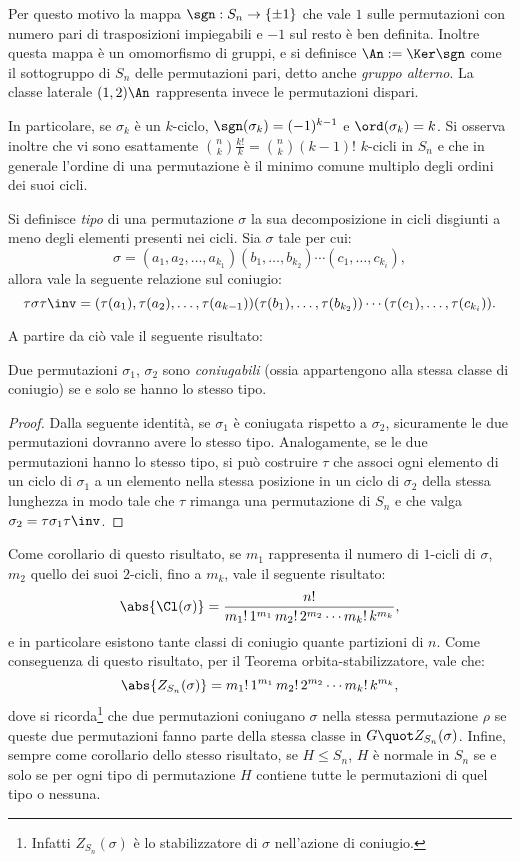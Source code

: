 \documentclass[12pt]{scrartcl}
\begin{document}
	Per questo motivo la mappa $\sgn : S_n \to \{\pm 1\}$ che vale $1$ sulle
	permutazioni con numero pari di trasposizioni impiegabili e $-1$ sul resto
	è ben definita. Inoltre questa mappa è un omomorfismo di gruppi, e si
	definisce $\An := \Ker \sgn$ come il sottogruppo di $S_n$ delle permutazioni
	pari, detto anche \textit{gruppo alterno}. La classe laterale $(1, 2) \An$
	rappresenta invece le permutazioni dispari. \medskip
	
	
	In particolare, se $\sigma_k$ è un $k$-ciclo, $\sgn(\sigma_k) = (-1)^{k-1}$ e $\ord(\sigma_k) = k$. Si osserva inoltre che vi sono esattamente $\binom{n}{k} \frac{k!}{k} =
	\binom{n}{k} (k-1)!$ $k$-cicli in $S_n$ e che in generale l'ordine
	di una permutazione è il minimo comune multiplo degli
	ordini dei suoi cicli. \medskip
	

	Si definisce \textit{tipo} di una permutazione $\sigma$ la sua decomposizione
	in cicli disgiunti a meno degli elementi presenti nei cicli. Sia $\sigma$
	tale per cui:
	\[ \sigma = (a_1, a_2, \ldots, a_{k_1}) (b_1, \ldots, b_{k_2}) \cdots (c_1, \ldots, c_{k_i}), \]
	allora vale la seguente relazione sul coniugio:
	\[ \tau \sigma \tau\inv = (\tau(a_1), \tau(a_2), \ldots, \tau(a_{k-1})) (\tau(b_1), \ldots, \tau(b_{k_2})) \cdots (\tau(c_1), \ldots, \tau(c_{k_i})). \]
	
	A partire da ciò vale il seguente risultato:
	\begin{proposition}
		Due permutazioni $\sigma_1$, $\sigma_2$ sono \textit{coniugabili}
		(ossia appartengono alla stessa classe di coniugio) se e solo se
		hanno lo stesso tipo.
	\end{proposition}
	
	\begin{proof}
		Dalla seguente identità, se $\sigma_1$ è coniugata rispetto a
		$\sigma_2$, sicuramente le due permutazioni dovranno avere lo stesso
		tipo. Analogamente, se le due permutazioni hanno lo stesso tipo,
		si può costruire $\tau$ che associ ogni elemento di
		un ciclo di $\sigma_1$ a un elemento nella stessa posizione in un ciclo
		di $\sigma_2$ della stessa lunghezza in modo tale che $\tau$ rimanga
		una permutazione di $S_n$ e che valga $\sigma_2 = \tau \sigma_1 \tau\inv$.
	\end{proof}
	
	Come corollario di questo risultato, se $m_1$ rappresenta il numero di $1$-cicli di $\sigma$, $m_2$ quello dei suoi $2$-cicli, fino a $m_k$, vale il seguente risultato:
	\[ \abs{\Cl(\sigma)} = \frac{n!}{m_1! \, 1^{m_1} \, m_2! \, 2^{m_2} \cdots m_k! \, k^{m_k}}, \]
	e in particolare esistono tante classi di coniugio quante partizioni di $n$.
	Come conseguenza di questo risultato, per il Teorema orbita-stabilizzatore,
	vale che:
	\[ \abs{Z_{S_n}(\sigma)} = m_1! \, 1^{m_1} \, m_2! \, 2^{m_2} \cdots m_k! \, k^{m_k}, \]
	dove si ricorda\footnote{
		Infatti $Z_{S_n}(\sigma)$ è lo stabilizzatore di $\sigma$ nell'azione di coniugio.
	} che due permutazioni coniugano $\sigma$ nella stessa permutazione
	$\rho$ se queste due permutazioni fanno parte della stessa classe in $G \quot Z_{S_n}(\sigma)$. Infine,
	sempre come corollario dello stesso risultato,
	se $H \leq S_n$, $H$ è normale in $S_n$ se e solo se per ogni tipo di
	permutazione $H$ contiene
	tutte le permutazioni di quel tipo o nessuna. \medskip
\end{document}
